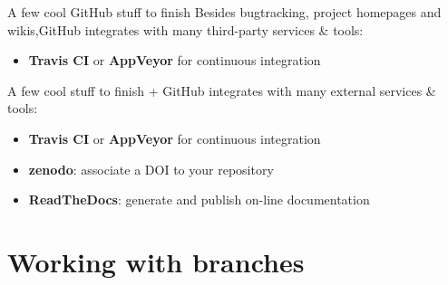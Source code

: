 \documentclass[compress]{beamer}
\begin{document}
\begin{frame}{A few cool GitHub stuff to finish}
    Besides bugtracking, project homepages and wikis,GitHub integrates with many
    third-party services \& tools:

    \begin{itemize}
        \item {\bf Travis CI} or {\bf AppVeyor} for continuous integration
    \end{itemize}
\end{frame}


\begin{frame}{A few cool stuff to finish}
    + GitHub integrates with many external services 
    \& tools:

    \begin{itemize}
        \item {\bf Travis CI} or {\bf AppVeyor} for continuous integration
        \item {\bf zenodo}: associate a DOI to your repository
        \item {\bf ReadTheDocs}: generate and publish on-line 
            documentation
    \end{itemize}
\end{frame}




\section{Working with branches}
\end{document}
